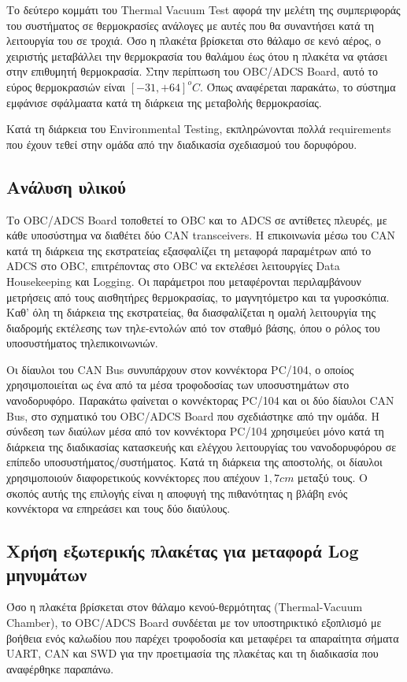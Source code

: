 \documentclass[a4paper,nobib,justified]{tufte-book}
\begin{document}
Το δεύτερο κομμάτι του Thermal Vacuum Test αφορά την μελέτη της συμπεριφοράς του συστήματος σε θερμοκρασίες ανάλογες με αυτές που θα συναντήσει κατά τη λειτουργία του σε τροχιά. Όσο η πλακέτα βρίσκεται στο θάλαμο σε κενό αέρος, ο χειριστής μεταβάλλει την θερμοκρασία του θαλάμου έως ότου η πλακέτα να φτάσει στην επιθυμητή θερμοκρασία. Στην περίπτωση του OBC/ADCS Board, αυτό το εύρος θερμοκρασιών είναι $[-31,+64] ^o C$. Όπως αναφέρεται παρακάτω, το σύστημα εμφάνισε σφάλμαατα κατά τη διάρκεια της μεταβολής θερμοκρασίας.

Κατά τη διάρκεια του Environmental Testing, εκπληρώνονται πολλά requirements που έχουν τεθεί στην ομάδα από την διαδικασία σχεδιασμού του δορυφόρου.
\subsection{Ανάλυση υλικού}
Το OBC/ADCS Board τοποθετεί το OBC και το ADCS σε αντίθετες πλευρές, με κάθε υποσύστημα να διαθέτει δύο CAN transceivers. Η επικοινωνία μέσω του CAN κατά τη διάρκεια της εκστρατείας εξασφαλίζει τη μεταφορά παραμέτρων από το ADCS στο OBC, επιτρέποντας στο OBC να εκτελέσει λειτουργίες Data Housekeeping και Logging. Οι παράμετροι που μεταφέρονται περιλαμβάνουν μετρήσεις από τους αισθητήρες θερμοκρασίας, το μαγνητόμετρο και τα γυροσκόπια. Καθ' όλη τη διάρκεια της εκστρατείας, θα διασφαλίζεται η ομαλή λειτουργία της διαδρομής εκτέλεσης των τηλε-εντολών από τον σταθμό βάσης, όπου ο ρόλος του υποσυστήματος τηλεπικοινωνιών.

Οι δίαυλοι του CAN Bus συνυπάρχουν στον κοννέκτορα PC/104, ο οποίος χρησιμοποιείται ως ένα από τα μέσα τροφοδοσίας των υποσυστημάτων στο νανοδορυφόρο. Παρακάτω φαίνεται ο κοννέκτορας PC/104 και οι δύο δίαυλοι CAN Bus, στο σχηματικό του OBC/ADCS Board που σχεδιάστηκε από την ομάδα. Η σύνδεση των διαύλων μέσα από τον κοννέκτορα PC/104 χρησιμεύει μόνο κατά τη διάρκεια της διαδικασίας κατασκευής και ελέγχου λειτουργίας του νανοδορυφόρου σε επίπεδο υποσυστήματος/συστήματος. Κατά τη διάρκεια της αποστολής, οι δίαυλοι χρησιμοποιούν διαφορετικούς κοννέκτορες που απέχουν $1,7cm$ μεταξύ τους. Ο σκοπός αυτής της επιλογής είναι η αποφυγή της πιθανότητας η βλάβη ενός κοννέκτορα να επηρεάσει και τους δύο διαύλους. 

\subsection{Χρήση εξωτερικής πλακέτας για μεταφορά Log μηνυμάτων}
Όσο η πλακέτα βρίσκεται στον θάλαμο κενού-θερμότητας (Thermal-Vacuum Chamber), το OBC/ADCS Board συνδέεται με τον υποστηρικτικό εξοπλισμό με βοήθεια ενός καλωδίου που παρέχει τροφοδοσία και μεταφέρει τα απαραίτητα σήματα UART, CAN και SWD για την προετιμασία της πλακέτας και τη διαδικασία που αναφέρθηκε παραπάνω.
\end{document}
